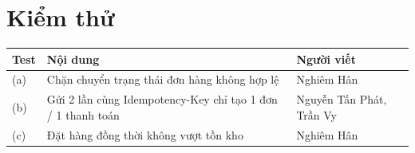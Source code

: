 \section{Kiểm thử}

\begin{tabularx}{\linewidth}{|l|X|l|}
\hline
\textbf{Test} & \textbf{Nội dung} & \textbf{Người viết} \\ \hline
(a) & Chặn chuyển trạng thái đơn hàng không hợp lệ & Nghiêm Hân \\ \hline
(b) & Gửi 2 lần cùng Idempotency-Key chỉ tạo 1 đơn / 1 thanh toán & Nguyễn Tấn Phát, Trần Vy \\ \hline
(c) & Đặt hàng đồng thời không vượt tồn kho & Nghiêm Hân \\ \hline
\end{tabularx}

